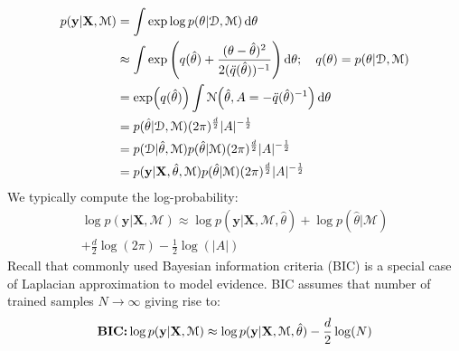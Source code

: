\begin{align*}
   p(\textbf{y}|\textbf{X},\mathcal{M}) &= \int \exp \log  p(\theta|\mathcal{D},\mathcal{M})\mathop{}\!\mathrm{d}{\theta} \\
   & \approx \int \exp \Bigg( q(\hat{\theta}) +\frac{(\theta-\hat{\theta})^{2}}{2 (\ddot q(\hat{\theta}))^{-1}}\Bigg)\mathop{}\!\mathrm{d}{\theta}; \quad q(\theta)=p(\theta|\mathcal{D},\mathcal{M}) \\ 
   & = \exp(q(\hat{\theta}))\int \mathcal{N}\Big(\hat{\theta},A=-\ddot q(\hat{\theta})^{-1}\Big)\mathop{}\!\mathrm{d}{\theta} \\
   & = p(\hat{\theta}|\mathcal{D},\mathcal{M})(2\pi)^{\frac{d}{2}}|A|^{-\frac{1}{2}} \\
   & = p(\mathcal{D} | \hat{\theta}, \mathcal{M})p(\hat{\theta} | \mathcal{M})(2\pi)^{\frac{d}{2}}|A|^{-\frac{1}{2}} \\
    & = p(\textbf{y} | \textbf{X}, \hat{\theta}, \mathcal{M})p(\hat{\theta} | \mathcal{M})(2\pi)^{\frac{d}{2}}|A|^{-\frac{1}{2}} \\
\end{align*}
{We typically compute the log-probability:}
\begin{align*}
  \log p(\textbf{y}|\textbf{X},\mathcal{M}) \approx \log p(\textbf{y}|\textbf{X},\mathcal{M},\hat{\theta}) + \log p(\hat{\theta}|\mathcal{M}) \\
  + \frac{d}{2}\log(2\pi) -\frac{1}{2}\log(|A|)  
\end{align*}
Recall that commonly used Bayesian information criteria (BIC) is a special case of Laplacian approximation to model evidence. BIC assumes that number of trained samples \(N\rightarrow \infty \) giving rise to:
\begin{align*}
    \text{\textbf{BIC:}}  \log p(\textbf{y}|\textbf{X},\mathcal{M}) \approx \log p(\textbf{y}|\textbf{X},\mathcal{M},\hat{\theta}) - \frac{d}{2}\log(N)
\end{align*}

